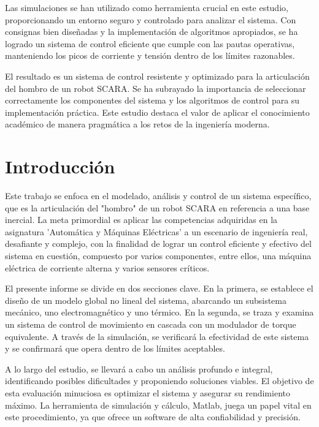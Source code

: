 \documentclass{article}
\begin{document}
Las simulaciones se han utilizado como herramienta crucial en este estudio, proporcionando un entorno 
seguro y controlado para analizar el sistema. Con consignas bien diseñadas y la implementación de 
algoritmos apropiados, se ha logrado un sistema de control eficiente que cumple con las pautas operativas, manteniendo los picos de corriente y tensión dentro de los límites razonables.

El resultado es un sistema de control resistente y optimizado para la articulación del hombro de un 
robot SCARA. Se ha subrayado la importancia de seleccionar correctamente los componentes del sistema 
y los algoritmos de control para su implementación práctica. Este estudio destaca el valor de aplicar 
el conocimiento académico de manera pragmática a los retos de la ingeniería moderna.

\newpage

\part*{Introducción}

\lipsum[0]

Este trabajo se enfoca en el modelado, análisis y control de un sistema específico, que es la articulación 
del "hombro" de un robot SCARA en referencia a una base inercial. La meta primordial es aplicar las 
competencias adquiridas en la asignatura 'Automática y Máquinas Eléctricas' a un escenario de ingeniería real, 
desafiante y complejo, con la finalidad de lograr un control eficiente y efectivo del sistema en cuestión, 
compuesto por varios componentes, entre ellos, una máquina eléctrica de corriente alterna y varios sensores críticos.

El presente informe se divide en dos secciones clave. En la primera, se establece el diseño de un modelo global 
no lineal del sistema, abarcando un subsistema mecánico, uno electromagnético y uno térmico. En la segunda, se traza 
y examina un sistema de control de movimiento en cascada con un modulador de torque equivalente. A través de la simulación, 
se verificará la efectividad de este sistema y se confirmará que opera dentro de los límites aceptables.

A lo largo del estudio, se llevará a cabo un análisis profundo e integral, identificando posibles dificultades y 
proponiendo soluciones viables. El objetivo de esta evaluación minuciosa es optimizar el sistema y asegurar su 
rendimiento máximo. La herramienta de simulación y cálculo, Matlab, juega un papel vital en este procedimiento, ya 
que ofrece un software de alta confiabilidad y precisión.
\end{document}
